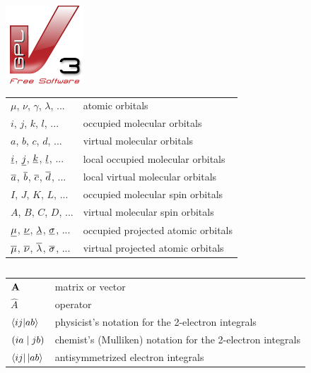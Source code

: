 \documentclass[a4paper,12pt]{book}
\begin{document}
\vspace*{\fill}

\noindent 
\includegraphics[scale=1.0]{Pics/license}


\newpage

\newpage


{
\setlength{\tabcolsep}{14pt}
\renewcommand{\arraystretch}{1.5}
\begin{longtable}[l]{ll}
$\mu$, $\nu$, $\gamma$, $\lambda$, ... & atomic orbitals \\
$i$, $j$, $k$, $l$, ... & occupied molecular orbitals \\
$a$, $b$, $c$, $d$, ... & virtual molecular orbitals \\
$\underline{i}$, $\underline{j}$, $\underline{k}$, $\underline{l}$, ... & local occupied molecular orbitals \\
$\overline{a}$, $\overline{b}$, $\overline{c}$, $\overline{d}$, ... & local virtual molecular orbitals \\
$I$, $J$, $K$, $L$, ... & occupied molecular spin orbitals \\
$A$, $B$, $C$, $D$, ... & virtual molecular spin orbitals \\
$\underline{\mu}$, $\underline{\nu}$, $\underline{\lambda}$, $\underline{\sigma}$, ... & occupied projected atomic orbitals \\
$\overline{\mu}$, $\overline{\nu}$, $\overline{\lambda}$, $\overline{\sigma}$, ... & virtual projected atomic orbitals
\end{longtable}
}

\vspace{0.5cm}

{
\setlength{\tabcolsep}{14pt}
\renewcommand{\arraystretch}{1.5}
\begin{longtable}[l]{ll}

\end{longtable}
}


{
\setlength{\tabcolsep}{14pt}
\renewcommand{\arraystretch}{1.5}
\begin{longtable}[l]{ll}
$\mathbf{A}$ & matrix or vector \\
$\hat{A}$ & operator \\
$\bra{\smash{ij}}\ket{\smash{ab}}$ & physicist's notation for the 2-electron integrals \\
$\left( \smash{ia} \mid \smash{jb}\right)$ & chemist's (Mulliken) notation for the 2-electron integrals \\
$\sbra{ij}\sket{ab}$ & antisymmetrized electron integrals
\end{longtable}
}
\end{document}
